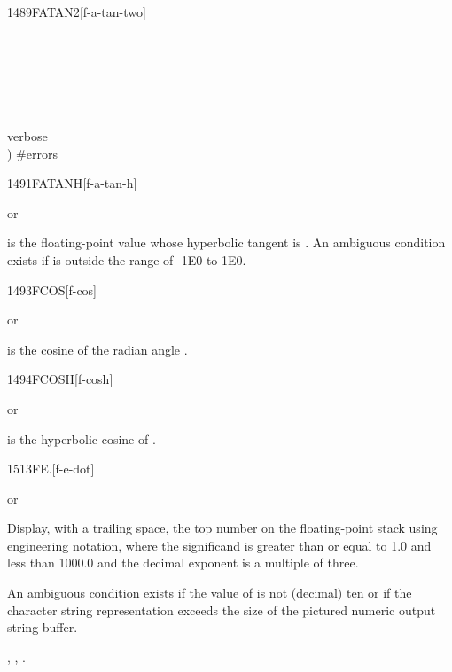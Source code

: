 \begin{worddef}{1489}{FATAN2}[f-a-tan-two]
\begin{testing}
		  \\
		\\

		  \\
		\\

		verbose  \word[tools]{[IF]} \\
		\tab {}   ) \#errors    \\
		\word[tools]{[THEN]}
	\end{testing}
\end{worddef}


\begin{worddef}{1491}{FATANH}[f-a-tan-h]
\item {} or

	 is the floating-point value whose hyperbolic tangent is
	. An ambiguous condition exists if  is outside
	the range of -1E0 to 1E0.
\end{worddef}


\begin{worddef}{1493}{FCOS}[f-cos]
\item {} or

	 is the cosine of the radian angle .
\end{worddef}


\begin{worddef}{1494}{FCOSH}[f-cosh]
\item {} or

	 is the hyperbolic cosine of .
\end{worddef}


\begin{worddef}[FEd]{1513}{FE.{}}[f-e-dot]
\item \stack{}{}  or

	Display, with a trailing space, the top number on the
	floating-point stack using engineering notation, where the
	significand is greater than or equal to 1.0 and less than
	1000.0 and the decimal exponent is a multiple of three.

	An ambiguous condition exists if the value of 
	is not (decimal) ten or if the character string representation
	exceeds the size of the pictured numeric output string buffer.

\see {},
	,
	.
\end{worddef}


